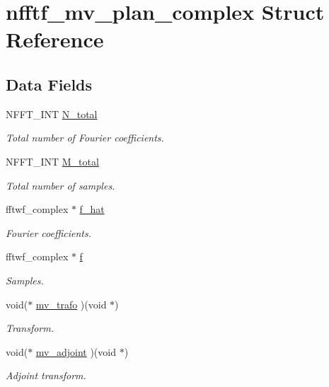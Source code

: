 \hypertarget{structnfftf__mv__plan__complex}{\section{nfftf\-\_\-mv\-\_\-plan\-\_\-complex Struct Reference}
\label{structnfftf__mv__plan__complex}
}
\subsection*{Data Fields}
\begin{DoxyCompactItemize}
\item 
N\-F\-F\-T\-\_\-\-I\-N\-T \hyperlink{structnfftf__mv__plan__complex_aef57ee79b358ffeac59de31b788a687f}{N\-\_\-total}
\begin{DoxyCompactList}\small\item\em Total number of Fourier coefficients. \end{DoxyCompactList}\item 
N\-F\-F\-T\-\_\-\-I\-N\-T \hyperlink{structnfftf__mv__plan__complex_a01242722facc53c79fba9c947741e01e}{M\-\_\-total}
\begin{DoxyCompactList}\small\item\em Total number of samples. \end{DoxyCompactList}\item 
fftwf\-\_\-complex $\ast$ \hyperlink{structnfftf__mv__plan__complex_ad55a895ef394e9b74db36d028656b382}{f\-\_\-hat}
\begin{DoxyCompactList}\small\item\em Fourier coefficients. \end{DoxyCompactList}\item 
fftwf\-\_\-complex $\ast$ \hyperlink{structnfftf__mv__plan__complex_ab3a2f060f60eb88cd268bc1bec2e5310}{f}
\begin{DoxyCompactList}\small\item\em Samples. \end{DoxyCompactList}\item 
void($\ast$ \hyperlink{structnfftf__mv__plan__complex_a48e28caf604132d02999d1dc0f5dc9a0}{mv\-\_\-trafo} )(void $\ast$)
\begin{DoxyCompactList}\small\item\em Transform. \end{DoxyCompactList}\item 
void($\ast$ \hyperlink{structnfftf__mv__plan__complex_acbff2532fc4d66cf92321be33ef6498f}{mv\-\_\-adjoint} )(void $\ast$)
\begin{DoxyCompactList}\small\item\em Adjoint transform. \end{DoxyCompactList}\end{DoxyCompactItemize}


